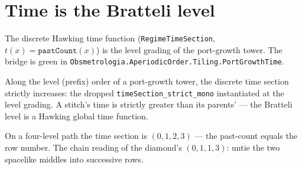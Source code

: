 \section{Time is the Bratteli level}

The discrete Hawking time function (\texttt{RegimeTimeSection}, $t(x) = \texttt{pastCount}(x)$) is the
level grading of the port-growth tower. The bridge is green in \texttt{Obsmetrologia.AperiodicOrder.Tiling.PortGrowthTime}.

\begin{theorem}\label{thm:weaving-advances-time}\leanok{}
Along the level (prefix) order of a port-growth tower, the discrete time section strictly increases:
the dropped \texttt{timeSection\_strict\_mono} instantiated at the level grading. A stitch's time is
strictly greater than its parents' --- the Bratteli level is a Hawking global time function.
\end{theorem}

\begin{theorem}\label{thm:time-is-level}\leanok{}
On a four-level path the time section is $(0,1,2,3)$ --- the past-count equals the row number. The
chain reading of the diamond's $(0,1,1,3)$: untie the two spacelike middles into successive rows.
\end{theorem}
